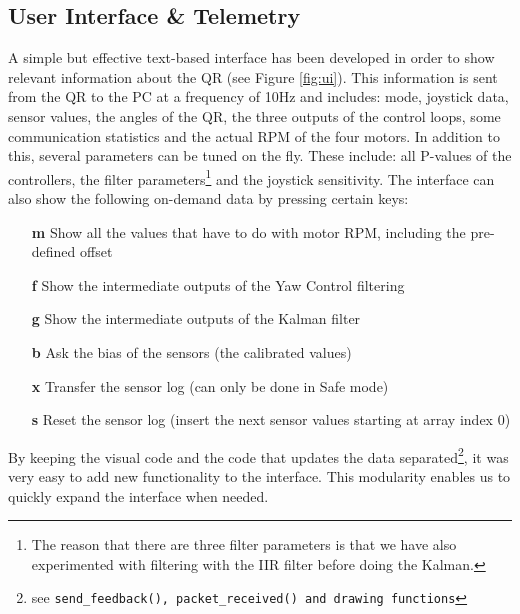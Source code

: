 \documentclass[a4paper]{article}
\begin{document}
\subsection{User Interface \& Telemetry} %
A simple but effective text-based interface has been developed in order to show relevant information about the QR (see Figure \ref{fig:ui}). This information is sent from the QR to the PC at a frequency of 10Hz and includes: mode, joystick data, sensor values, the angles of the QR, the three outputs of the control loops, some communication statistics and the actual RPM of the four motors. In addition to this, several parameters can be tuned on the fly. These include: all P-values of the controllers, the filter parameters\footnote[1]{The reason that there are three filter parameters is that we have also experimented with filtering with the IIR filter before doing the Kalman.} and the joystick sensitivity. The interface can also show the following on-demand data by pressing certain keys:
\begin{itemize}
\setlength\itemsep{-0.3em}%
\item[\textbf{m}] Show all the values that have to do with motor RPM, including the pre-defined offset
\item[\textbf{f}] Show the intermediate outputs of the Yaw Control filtering
\item[\textbf{g}] Show the intermediate outputs of the Kalman filter
\item[\textbf{b}] Ask the bias of the sensors (the calibrated values)
\item[\textbf{x}] Transfer the sensor log (can only be done in Safe mode)
\item[\textbf{s}] Reset the sensor log (insert the next sensor values starting at array index 0)
\end{itemize}
By keeping the visual code and the code that updates the data separated\footnote[2]{see \texttt{send\_feedback(), packet\_received() and drawing functions}}, it was very easy to add new functionality to the interface. This modularity enables us to quickly expand the interface when needed.
\end{document}
